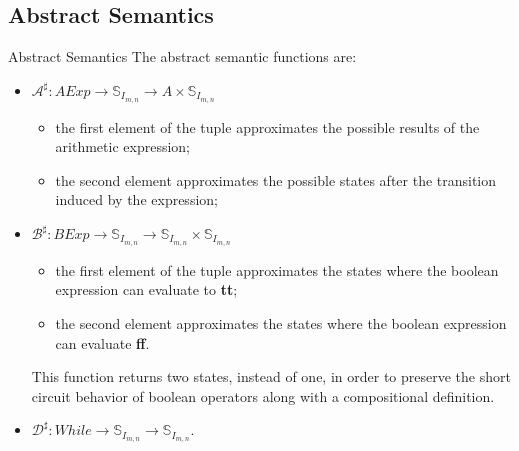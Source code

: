 \subsection{Abstract Semantics}

\begin{frame}{Abstract Semantics}
    The abstract semantic functions are:
    \begin{itemize}
        \item $\mathcal{A}^\sharp : AExp \to \mathbb{S}_{I_{m,n}} \to A \times \mathbb{S}_{I_{m,n}}$
        \begin{itemize}
            \item the first element of the tuple approximates the possible results of the arithmetic expression;
            \item the second element approximates the possible states after the transition induced by the expression;
        \end{itemize}
        \item $\mathcal{B}^\sharp : BExp \to \mathbb{S}_{I_{m,n}} \to \mathbb{S}_{I_{m,n}} \times \mathbb{S}_{I_{m,n}}$
        \begin{itemize}
            \item the first element of the tuple approximates the states where the boolean expression can evaluate to \textbf{tt};
            \item the second element approximates the states where the boolean expression can evaluate \textbf{ff}.
        \end{itemize}
        This function returns two states, instead of one, in order to preserve the short circuit behavior of boolean operators along with a compositional definition.
        \item $\mathcal{D}^\sharp : While \to \mathbb{S}_{I_{m,n}} \to\mathbb{S}_{I_{m,n}}$.
    \end{itemize}
\end{frame}

